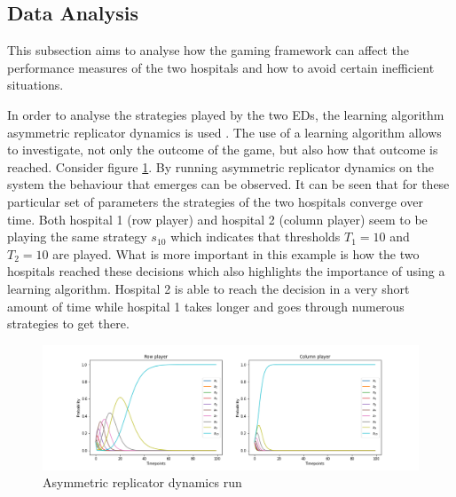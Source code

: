 \subsection{Data Analysis}

This subsection aims to analyse how the gaming framework can affect the 
performance measures of the two hospitals and how to avoid certain inefficient 
situations.

In order to analyse the strategies played by the two EDs, the learning algorithm
asymmetric replicator dynamics is used \cite{asymmetricreplicatordynamics}.
The use of a learning algorithm allows to investigate, not only the outcome of 
the game, but also how that outcome is reached.
Consider figure \ref{fig:ard-by-itself}. 
By running asymmetric replicator dynamics on the system the behaviour that 
emerges can be observed.
It can be seen that for these particular set of parameters the strategies of 
the two hospitals converge over time. 
Both hospital 1 (row player) and hospital 2 (column player) seem to be playing 
the same strategy \(s_10\) which indicates that thresholds \(T_1 = 10\) and 
\(T_2 = 10\) are played.
What is more important in this example is how the two hospitals reached these
decisions which also highlights the importance of using a learning algorithm.
Hospital 2 is able to reach the decision in a very short amount of time while 
hospital 1 takes longer and goes through numerous strategies to get there.

\begin{figure}[H]
    \centering
    \includegraphics[scale=0.4, trim=120 0 120 0]{imgs/asymmetric_rd/asymmetric_rd.png}
    \caption{Asymmetric replicator dynamics run}
    \label{fig:ard-by-itself}
\end{figure}


